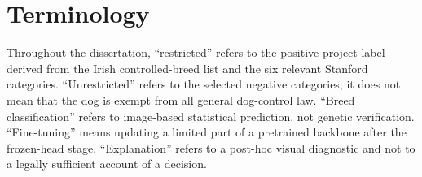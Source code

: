 \section{Terminology}
Throughout the dissertation, ``restricted'' refers to the positive project label derived from the Irish controlled-breed list and the six relevant Stanford categories. ``Unrestricted'' refers to the selected negative categories; it does not mean that the dog is exempt from all general dog-control law. ``Breed classification'' refers to image-based statistical prediction, not genetic verification. ``Fine-tuning'' means updating a limited part of a pretrained backbone after the frozen-head stage. ``Explanation'' refers to a post-hoc visual diagnostic and not to a legally sufficient account of a decision.
